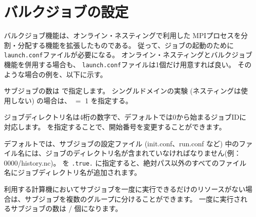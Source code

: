 \section{バルクジョブの設定}
バルクジョブ機能は、オンライン・ネスティングで利用した
MPIプロセスを分割・分配する機能を拡張したものである。
従って、ジョブの起動のために\verb|launch.conf|ファイルが必要になる。
オンライン・ネスティングとバルクジョブ機能を併用する場合も、
\verb|launch.conf|ファイルは1個だけ用意すれば良い。
そのような場合の例を、以下に示す。

サブジョブの数は  で指定します。
シングルドメインの実験 (ネスティングは使用しない) の場合は、 $=$ 1 を指定する。

ジョブディレクトリ名は4桁の数字で、デフォルトでは0から始まるジョブIDに対応します。
を指定することで、開始番号を変更することができます。

デフォルトでは、サブジョブの設定ファイル (init.conf、run.conf など) 中のファイル名には、ジョブのディレクトリ名が含まれていなければなりません(例：0000/history.nc)。
を \verb|.true.| に指定すると、絶対パス以外のすべてのファイル名にジョブディレクトリ名が追加されます。

利用する計算機においてサブジョブを一度に実行できるだけのリソースがない場合は、サブジョブを複数のグループに分けることができます。
一度に実行されるサブジョブの数は  /  個になります。


